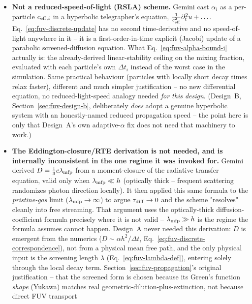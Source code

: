 \begin{itemize}
  \item \textbf{Not a reduced-speed-of-light (RSLA) scheme.} Gemini
    cast $\alpha_i$ as a per-particle $c_{{\rm eff},i}$ in a hyperbolic
    telegrapher's equation, $\frac{1}{c_{\rm eff}^2}\partial_t^2u+\ldots$.
    Eq.~\ref{eq:fuv-discrete-update} has no second time-derivative and
    no speed-of-light anywhere in it -- it is a first-order-in-time
    explicit (Jacobi) update of a parabolic screened-diffusion equation.
    What Eq.~\ref{eq:fuv-alpha-bound-i} actually is: the already-derived
    linear-stability ceiling on the mixing fraction, evaluated with each
    particle's own $\Delta t_i$ instead of the worst case in the
    simulation. Same practical behaviour (particles with locally short
    decay times relax faster), different and much simpler
    justification -- no new differential equation, no reduced-light-speed
    analogy needed \emph{for this design}. (Design~B,
    Section~\ref{sec:fuv-design-b}, deliberately \emph{does} adopt a
    genuine hyperbolic system with an honestly-named reduced propagation
    speed -- the point here is only that Design~A's own adaptive-$\alpha$
    fix does not need that machinery to work.)
  \item \textbf{The Eddington-closure/RTE derivation is not needed, and
    is internally inconsistent in the one regime it was invoked for.}
    Gemini derived $D=\tfrac13c\lambda_{\rm mfp}$ from a moment-closure
    of the radiative transfer equation, valid only when
    $\lambda_{\rm mfp}\ll h$ (optically thick -- frequent scattering
    randomizes photon direction locally). It then applied this same
    formula to the \emph{pristine-gas} limit ($\lambda_{\rm
    mfp}\to\infty$) to argue $\tau_{\rm diff}\to0$ and the scheme
    "resolves" cleanly into free streaming. That argument uses the
    optically-thick diffusion-coefficient formula precisely where it is
    not valid -- $\lambda_{\rm mfp}\gg h$ is the regime the formula
    assumes cannot happen. Design~A never needed this derivation:
    $D$ is emergent from the numerics ($D\sim\alpha h^2/\Delta t$,
    Eq.~\ref{eq:fuv-discrete-correspondence}), not from a physical mean
    free path, and the only physical input is the screening length
    $\lambda$ (Eq.~\ref{eq:fuv-lambda-def}), entering solely through the
    local decay term. Section~\ref{sec:fuv-propagation}'s original
    justification -- that the screened form is chosen because its
    Green's function \emph{shape} (Yukawa) matches real
    geometric-dilution-plus-extinction, not because direct FUV transport

\end{itemize}

